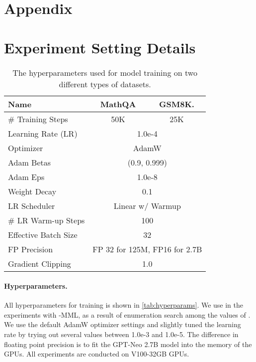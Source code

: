 \newpage
\appendix
\section*{Appendix}

\section{Experiment Setting Details}
\label{sec:training-details}
\begin{table}[!ht]
\centering
\small
\begin{tabular}{l|cc}
\toprule
Name                 & MathQA             & GSM8K.                       \\\midrule
\# Training Steps    & 50K                & 25K                          \\
Learning Rate (LR)   & \multicolumn{2}{c}{1.0e-4}                        \\
Optimizer            & \multicolumn{2}{c}{AdamW}                         \\
Adam Betas           & \multicolumn{2}{c}{(0.9, 0.999)}                  \\
Adam Eps             & \multicolumn{2}{c}{1.0e-8}                        \\
Weight Decay         & \multicolumn{2}{c}{0.1}                           \\
LR Scheduler         & \multicolumn{2}{c}{Linear w/ Warmup}              \\
\# LR Warm-up Steps  & \multicolumn{2}{c}{100}                           \\
Effective Batch Size & \multicolumn{2}{c}{32}                            \\
FP Precision         & \multicolumn{2}{c}{FP 32 for 125M, FP16 for 2.7B} \\
Gradient Clipping    & \multicolumn{2}{c}{1.0}                           \\\bottomrule
\end{tabular}
\caption{The hyperparameters used for model training on two different types of datasets.}
\label{tab:hyperparams}
\end{table} \paragraph{Hyperparameters.} All hyperparameters for training is shown in \autoref{tab:hyperparams}. 
We use  in the experiments with -MML, as a result of enumeration search among the values of . 
We use the default AdamW optimizer settings and slightly tuned the learning rate by trying out several values between 1.0e-3 and 1.0e-5. The difference in floating point precision is to fit the GPT-Neo 2.7B model into the memory of the GPUs. All experiments are conducted on V100-32GB GPUs. 

